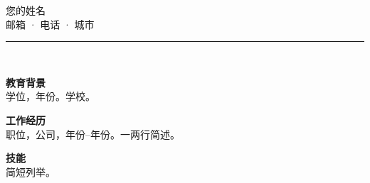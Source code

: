 \documentclass[11pt,a4paper]{article}
\begin{document}
\begin{center}
\vspace{0.5cm}
{\LARGE 您的姓名}\\[0.8em]
邮箱 \quad · \quad 电话 \quad · \quad 城市\\[0.6em]
\rule{1.8cm}{2.2cm}\\[0.6em]
\end{center}

\vspace{1em}
\textbf{教育背景}\\
学位，年份。学校。

\vspace{0.8em}
\textbf{工作经历}\\
职位，公司，年份--年份。一两行简述。

\vspace{0.8em}
\textbf{技能}\\
简短列举。
\end{document}
